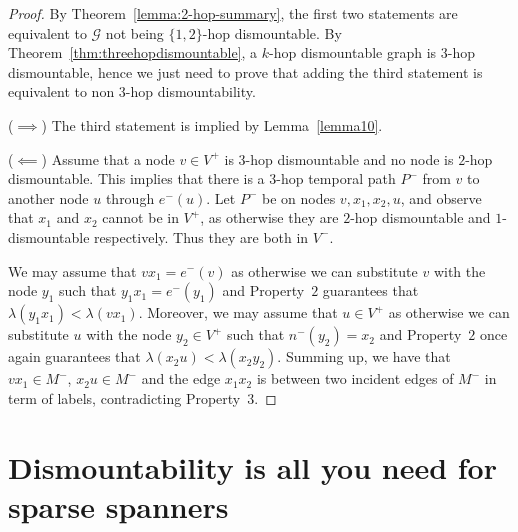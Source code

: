 \documentclass[USenglish, a4paper, thm-restate,numberwithinsect, cleveref]{lipics-v2021}
\newcommand{\G}{\ensuremath{\mathcal{G}}\xspace}
\begin{document}
\begin{proof}
  By Theorem~\ref{lemma:2-hop-summary}, the first two statements are equivalent to $\G$ not being $\{1,2\}$-hop dismountable.
  By Theorem~\ref{thm:threehopdismountable}, a $k$-hop dismountable graph is $3$-hop dismountable, hence we just need to prove that adding the third statement is equivalent to non $3$-hop dismountability.

  ($\implies$) The third statement is implied by Lemma~\ref{lemma10}.

  ($\impliedby$) Assume that a node $v \in V^+$ is $3$-hop dismountable and no node is $2$-hop dismountable.
  This implies that there is a $3$-hop temporal path $P^-$ from $v$ to another node $u$ through $e^-(u)$.
  Let $P^-$ be on nodes $v,x_1,x_2,u$, and observe that $x_1$ and $x_2$ cannot be in $V^+$, as otherwise they are $2$-hop dismountable and $1$-dismountable respectively.
  Thus they are both in $V^-$.

  We may assume that $vx_1 = e^-(v)$ as otherwise we can substitute $v$ with the node $y_1$ such that $y_1x_1 = e^-(y_1)$ and Property~$2$ guarantees that $\lambda(y_1x_1)<\lambda(vx_1)$.
  Moreover, we may assume that $u\in V^+$ as otherwise we can substitute $u$ with the node $y_2\in V^+$ such that $n^-(y_2)=x_2$ and Property~$2$ once again guarantees that $\lambda(x_2u)<\lambda(x_2y_2)$.
  Summing up, we have that $vx_1\in M^-$, $x_2u\in M^-$ and the edge $x_1x_2$  is between two incident edges of $M^-$ in term of labels, contradicting Property~$3$.
\end{proof}



\section{Dismountability is all you need for sparse spanners}
\label{sec:spanners}
\end{document}
